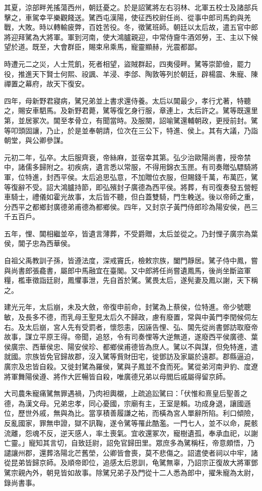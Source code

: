 \begin{pinyinscope}
其夏，涼部畔羌搖蕩西州，朝廷憂之。於是詔騭將左右羽林、北軍五校士及諸部兵擊之，車駕幸平樂觀餞送。騭西屯漢陽，使征西校尉任尚、從事中郎司馬鈞與羌戰，大敗。時以轉輸疲弊，百姓苦役。冬，徵騭班師。朝廷以太后故，遣五官中郎將迎拜騭為大將軍。軍到河南，使大鴻臚親迎，中常侍齎牛酒郊勞，王、主以下候望於道。既至，大會群臣，賜束帛乘馬，寵靈顯赫，光震都鄙。

時遭元二之災，人士荒飢，死者相望，盜賊群起，四夷侵畔。騭等崇節儉，罷力役，推進天下賢士何熙、祋諷、羊浸、李郃、陶敦等列於朝廷，辟楊震、朱寵、陳禪置之幕府，故天下復安。

四年，母新野君寢病，騭兄弟並上書求還侍養。太后以閶最少，孝行尤著，特聽之，賜安車駟馬。及新野君薨，騭等復乞身行服，章連上，太后許之。騭等既還里第，並居冢次。閶至孝骨立，有聞當時。及服闋，詔喻騭還輔朝政，更授前封。騭等叩頭固讓，乃止，於是並奉朝請，位次在三公下，特進、侯上。其有大議，乃詣朝堂，與公卿參謀。

元初二年，弘卒。太后服齊衰，帝絲麻，並宿幸其第。弘少治歐陽尚書，授帝禁中，諸儒多歸附之。初疾病，遺言悉以常服，不得用錦衣玉匣。有司奏贈弘驃騎將軍，位特進，封西平侯。太后追思弘意，不加贈位衣服，但賜錢千萬，布萬匹，騭等復辭不受。詔大鴻臚持節，即弘殯封子廣德為西平侯。將葬，有司復奏發五營輕車騎士，禮儀如霍光故事，太后皆不聽，但白蓋雙騎，門生輓送。後以帝師之重，分西平之都鄉封廣德弟甫德為都鄉侯。四年，又封京子黃門侍郎珍為陽安侯，邑三千五百戶。

五年，悝、閶相繼並卒，皆遺言薄葬，不受爵贈，太后並從之。乃封悝子廣宗為葉侯，閶子忠為西華侯。

自祖父禹教訓子孫，皆遵法度，深戒竇氏，檢敕宗族，闔門靜居。騭子侍中鳳，嘗與尚書郎張龕書，屬郎中馬融宜在臺閣。又中郎將任尚嘗遺鳳馬，後尚坐斷盜軍糧，檻車徵詣廷尉，鳳懼事泄，先自首於騭。騭畏太后，遂髡妻及鳳以謝，天下稱之。

建光元年，太后崩，未及大斂，帝復申前命，封騭為上蔡侯，位特進。帝少號聰敏，及長多不德，而乳母王聖見太后久不歸政，慮有廢置，常與中黃門李閏候伺左右。及太后崩，宮人先有受罰者，懷怨恚，因誣告悝、弘、閶先從尚書鄧訪取廢帝故事，謀立平原王得。帝聞，追怒，令有司奏悝等大逆無道，遂廢西平侯廣德、葉侯廣宗、西華侯忠、陽安侯珍、都鄉侯甫德皆為庶人。騭以不與謀，但免特進，遣就國。宗族皆免官歸故郡，沒入騭等貲財田宅，徙鄧訪及家屬於遠郡。郡縣逼迫，廣宗及忠皆自殺。又徙封騭為羅侯，騭與子鳳並不食而死。騭從弟河南尹豹、度遼將軍舞陽侯遵、將作大匠暢皆自殺，唯廣德兄弟以母閻后戚屬得留京師。

大司農朱寵痛騭無罪遇禍，乃肉袒輿櫬，上疏追訟騭曰：「伏惟和熹皇后聖善之德，為漢文母。兄弟忠孝，同心憂國，宗廟有主，王室是賴。功成身退，讓國遜位，歷世外戚，無與為比。當享積善履謙之祐，而橫為宮人單辭所陷。利口傾險，反亂國家，罪無申證，獄不訊鞠，遂令騭等罹此酷濫。一門七人，並不以命，屍骸流離，怨魂不反，逆天感人，率土喪氣。宜收還冢次，寵樹遺孤，奉承血祀，以謝亡靈。」寵知其言切，自致廷尉，詔免官歸田里。眾庶多為騭稱枉，帝意頗悟，乃譴讓州郡，還葬洛陽北芒舊塋，公卿皆會喪，莫不悲傷之。詔遣使者祠以中牢，諸從昆弟皆歸京師。及順帝即位，追感太后恩訓，龟騭無辜，乃詔宗正復故大將軍鄧騭宗親內外，朝見皆如故事。除騭兄弟子及門從十二人悉為郎中，擢朱寵為太尉，錄尚書事。


\end{pinyinscope}
